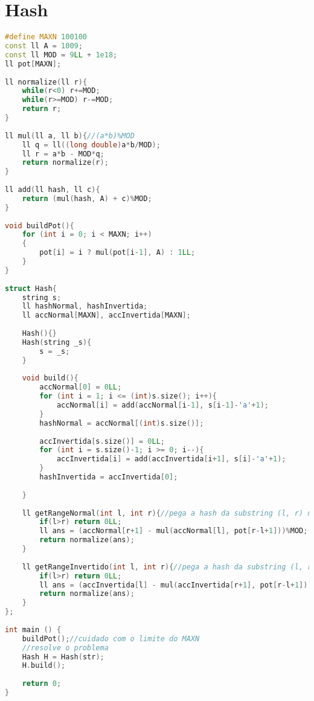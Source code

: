 \documentclass[12pt,a4paper,twoside]{report}
\begin{document}
\section{Hash}
\noindent\begin{lstlisting}[caption=Hash,language=C++]
#define MAXN 100100
const ll A = 1009;
const ll MOD = 9LL + 1e18;
ll pot[MAXN];
 
ll normalize(ll r){
    while(r<0) r+=MOD;
    while(r>=MOD) r-=MOD;
    return r;
}
 
ll mul(ll a, ll b){//(a*b)%MOD
    ll q = ll((long double)a*b/MOD);
    ll r = a*b - MOD*q;
    return normalize(r);
}
 
ll add(ll hash, ll c){
    return (mul(hash, A) + c)%MOD;
}
 
void buildPot(){
    for (int i = 0; i < MAXN; i++)
    {
        pot[i] = i ? mul(pot[i-1], A) : 1LL;
    }
}
 
struct Hash{
    string s;
    ll hashNormal, hashInvertida;
    ll accNormal[MAXN], accInvertida[MAXN];
     
    Hash(){}
    Hash(string _s){
        s = _s;
    }
     
    void build(){
        accNormal[0] = 0LL;
        for (int i = 1; i <= (int)s.size(); i++){
            accNormal[i] = add(accNormal[i-1], s[i-1]-'a'+1);
        }
        hashNormal = accNormal[(int)s.size()];
         
        accInvertida[s.size()] = 0LL;
        for (int i = s.size()-1; i >= 0; i--){
            accInvertida[i] = add(accInvertida[i+1], s[i]-'a'+1);
        }
        hashInvertida = accInvertida[0];
         
    }
     
    ll getRangeNormal(int l, int r){//pega a hash da substring (l, r) na string normal (abcd - [0, 2] = abc)
        if(l>r) return 0LL;
        ll ans = (accNormal[r+1] - mul(accNormal[l], pot[r-l+1]))%MOD;
        return normalize(ans);
    }
     
    ll getRangeInvertido(int l, int r){//pega a hash da substring (l, r) na string invertida (abcd - [0, 2] = cba)
        if(l>r) return 0LL;
        ll ans = (accInvertida[l] - mul(accInvertida[r+1], pot[r-l+1]))%MOD;
        return normalize(ans);
    }
};
 
int main () {
    buildPot();//cuidado com o limite do MAXN
    //resolve o problema
    Hash H = Hash(str);
    H.build();
     
    return 0;
}
\end{lstlisting}
\end{document}
